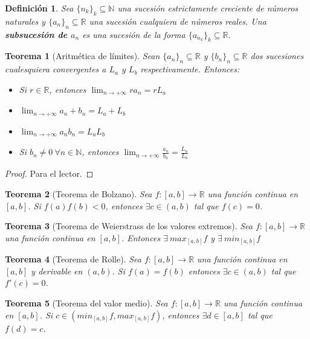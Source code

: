 \documentclass{article}
\newtheorem{theorem}{Teorema}
\newtheorem{define}{Definición}
\begin{document}
\begin{define}
	Sea $\{ n_k\}_k \subseteq \mathbb{N}$ una sucesión estrictamente creciente de números naturales y $\{ a_n\}_n \subseteq \mathbb{R}$ una sucesión cualquiera de números reales.
	Una \textbf{subsucesión de $a_n$} es una sucesión de la forma $\{ a_{n_k}\}_k \subseteq \mathbb{R}$.
\end{define}

\begin{theorem}[Aritmética de límites]
	Sean $\{ a_n\}_n \subseteq \mathbb{R}$ y $\{ b_n\}_n \subseteq \mathbb{R}$ dos sucesiones cualesquiera convergentes a $L_a$ y $L_b$ respectivamente. Entonces:
	\begin{itemize}
		\item
		Si $r \in \mathbb{R}$, entonces $\lim_{n\rightarrow +\infty} ra_n = rL_a$
		\item
		$\lim_{n\rightarrow +\infty} a_n + b_n = L_a + L_b$
		\item
		$\lim_{n\rightarrow +\infty} a_nb_n = L_aL_b$
		\item
		Si $b_n \neq 0\ \forall n \in \mathbb{N}$, entonces $\lim_{n\rightarrow +\infty} \frac{a_n}{b_n} = \frac{L_a}{L_b}$
	\end{itemize}
\end{theorem}

\begin{proof}
	Para el lector.
\end{proof}

\begin{theorem}[Teorema de Bolzano]
	Sea $f:[a,b]\rightarrow \mathbb{R}$ una función continua en $[a,b]$. Si $f(a)f(b)<0$, entonces $\exists c \in (a,b)$ tal que $f(c)=0$.
\end{theorem}

\begin{theorem}[Teorema de Weierstrass de los valores extremos]
	Sea $f:[a,b]\rightarrow \mathbb{R}$ una función continua en $[a,b]$. Entonces $\exists\ max_{[a,b]} f$ y $\exists\ min_{[a,b]} f$
\end{theorem}

\begin{theorem}[Teorema de Rolle]
	Sea $f:[a,b]\rightarrow \mathbb{R}$ una función continua en $[a,b]$ y derivable en $(a,b)$. Si $f(a)=f(b)$ entonces $\exists c \in (a,b)$ tal que $f'(c) = 0$.
\end{theorem}

\begin{theorem}[Teorema del valor medio]
	Sea $f:[a,b]\rightarrow \mathbb{R}$ una función continua en $[a,b]$. Si $c \in (min_{[a,b]} f, max_{[a,b]} f)$, entonces $\exists d \in [a,b]$ tal que $f(d) = c$.
\end{theorem}
	
\end{document}

